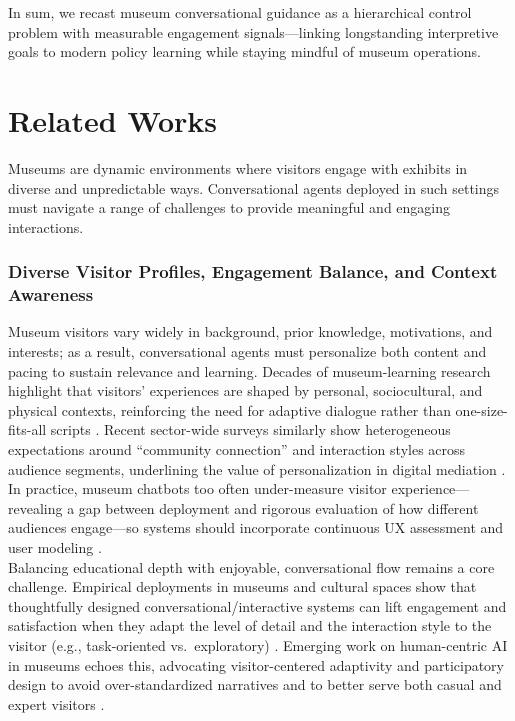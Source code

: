 \documentclass[12pt]{article}
\begin{document}
In sum, we recast museum conversational guidance as a hierarchical control problem with measurable engagement signals—linking longstanding interpretive goals to modern policy learning while staying mindful of museum operations.

\section{Related Works}

Museums are dynamic environments where visitors engage with exhibits in diverse and unpredictable ways. Conversational agents deployed in such settings must navigate a range of challenges to provide meaningful and engaging interactions.

\subsubsection*{Diverse Visitor Profiles, Engagement Balance, and Context Awareness}

Museum visitors vary widely in background, prior knowledge, motivations, and interests; as a result, conversational agents must personalize both content and pacing to sustain relevance and learning. Decades of museum-learning research highlight that visitors’ experiences are shaped by personal, sociocultural, and physical contexts, reinforcing the need for adaptive dialogue rather than one-size-fits-all scripts \citep{falk-dierking-2016-museum}. Recent sector-wide surveys similarly show heterogeneous expectations around “community connection” and interaction styles across audience segments, underlining the value of personalization in digital mediation \citep{aam-2024-data-story,aam-2024-staff}. In practice, museum chatbots too often under-measure visitor experience—revealing a gap between deployment and rigorous evaluation of how different audiences engage—so systems should incorporate continuous UX assessment and user modeling \citep{stekerova-2022-chatbots}.\\

Balancing educational depth with enjoyable, conversational flow remains a core challenge. Empirical deployments in museums and cultural spaces show that thoughtfully designed conversational/interactive systems can lift engagement and satisfaction when they adapt the level of detail and the interaction style to the visitor (e.g., task-oriented vs.\ exploratory) \citep{robinson-etal-2008-ask,chai-arayalert-2024-chatbot,chin-2024-wearableMR}. Emerging work on human-centric AI in museums echoes this, advocating visitor-centered adaptivity and participatory design to avoid over-standardized narratives and to better serve both casual and expert visitors \citep{derda-2025-human-centric}.\\
\end{document}
